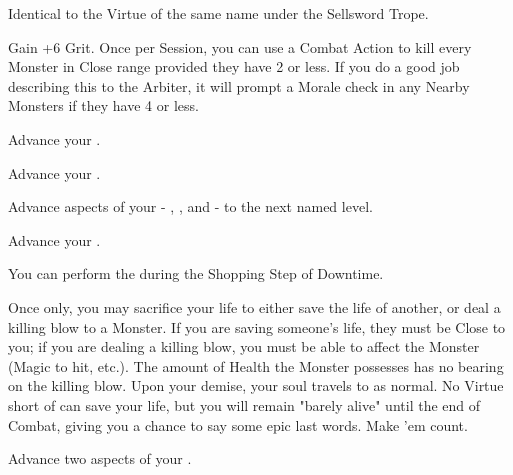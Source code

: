 \begin{multicols*}{2}

Identical to the Virtue of the same name under the Sellsword Trope.


Gain +6 \MAX Grit.  Once per Session, you can use a Combat Action to kill every Monster in Close range provided they have 2 \HD or less.  If you do a good job describing this to the Arbiter, it will prompt a Morale check in any Nearby Monsters if they have 4 \HD or less.  


Advance your  \DCUP.


Advance your  \DCUP.



Advance  aspects of your  - \DEATH, \INJURY, and \INSANITY - to the next named level.


Advance your  \DCUP.


You can perform the  during the Shopping Step of Downtime. 


Once only, you may sacrifice your life to either save the life of another, or deal a killing blow to a Monster. If you are saving someone's life, they must be Close to you; if you are dealing a killing blow, you must be able to affect the Monster (Magic to hit, etc.). The amount of Health the Monster possesses has no bearing on the killing blow. Upon your demise, your soul travels to  as normal. No Virtue short of  can save your life, but you will remain "barely alive" until the end of Combat, giving you a chance to say some epic last words.  Make 'em count.


Advance two  aspects of your  \DCUP.


\end{multicols*}
